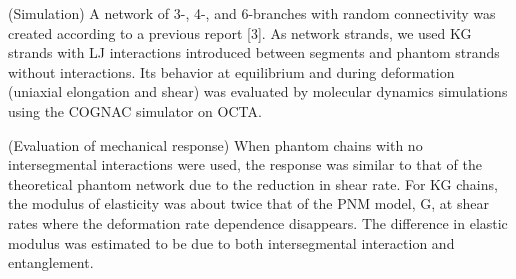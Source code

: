 \documentclass[uplatex,dvipdfmx,a4paper,12pt]{article}
\begin{document}
(Simulation) A network of 3-, 4-, and 6-branches with random connectivity was created according to a previous report [3].
As network strands, we used KG strands with LJ interactions introduced between segments and phantom strands without interactions.
Its behavior at equilibrium and during deformation (uniaxial elongation and shear) was evaluated by molecular dynamics simulations using the COGNAC simulator on OCTA.




(Evaluation of mechanical response) When phantom chains with no intersegmental interactions were used, the response was similar to that of the theoretical phantom network due to the reduction in shear rate.
For KG chains, the modulus of elasticity was about twice that of the PNM model, G, at shear rates where the deformation rate dependence disappears.
The difference in elastic modulus was estimated to be due to both intersegmental interaction and entanglement.
\end{document}
